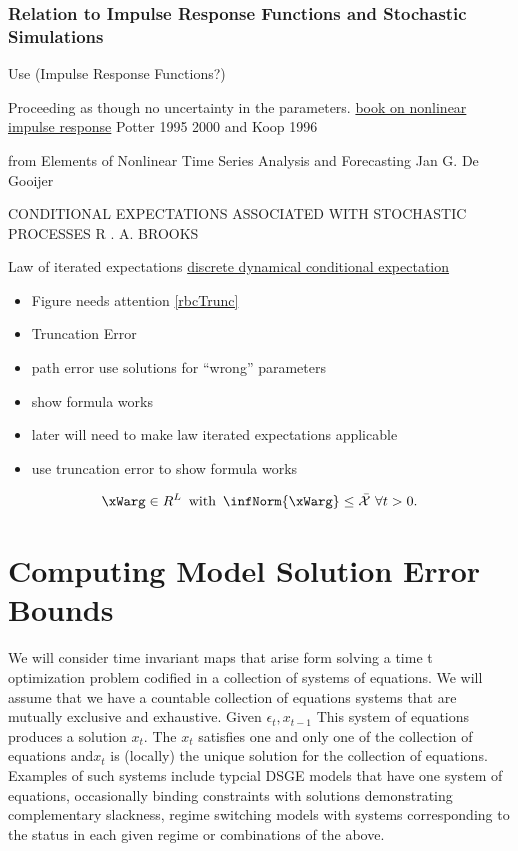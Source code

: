 \documentclass[12pt]{article}
\begin{document}
\subsubsection{Relation to Impulse Response Functions and Stochastic Simulations}
\label{sec:relImp}


Use (Impulse Response Functions?)

Proceeding as though no uncertainty in the parameters.
\href{https://books.google.co.uk/books?id=kLiRDgAAQBAJ&pg=PA77&lpg=PA77&dq=nonlinear+models+impulse+response+function+conditional+expectations&source=bl&ots=1pCjlcgxSu&sig=WA9INrvXVcFhVOd_2wq8-V6alw8&hl=en&sa=X&ved=0ahUKEwid1Y3fvuPWAhUlKsAKHT7lCDkQ6AEITjAF#v=onepage&q=nonlinear%20models%20impulse%20response%20function%20conditional%20expectations&f=false}{book on nonlinear impulse response}
  Potter 1995 2000 and Koop 1996

  from  Elements of Nonlinear Time Series Analysis and Forecasting  Jan G. De Gooijer

CONDITIONAL EXPECTATIONS ASSOCIATED WITH STOCHASTIC PROCESSES
R . A. BROOKS

Law of iterated expectations
\href{http://www.pnas.org/content/103/11/3968.full}{discrete dynamical conditional expectation} 
\label{sec:simple-rbc-model-2}

\begin{itemize}
\item Figure needs attention  \ref{rbcTrunc}
\item Truncation Error
\item path error use solutions for ``wrong'' parameters
\item show formula works
\item later will need to make law iterated expectations applicable
\item use truncation error to show formula works
\end{itemize}


 \begin{gather}
   \xWarg \in{R^L}\,\text{ with }\,\infNorm{\xWarg}  \le \bar{\mathcal{X}}\,\,\forall t> 0 \label{fFamily}.
 \end{gather}

\section{Computing Model Solution Error Bounds}
\label{sec:solnerrorbounds}

We will consider time invariant maps that arise form solving a time t optimization problem codified in a collection of systems of equations.  We will assume that we have a countable collection of equations systems that are mutually exclusive and exhaustive.  Given $\epsilon_t, x_{t-1}$  This system of equations produces a solution $x_t$.  The $x_t$ satisfies one and only one of the collection of equations and$x_t$ is (locally) the unique solution for the collection of
equations.  Examples of such systems include typcial DSGE models that have one
system of equations, occasionally binding constraints with solutions demonstrating complementary slackness, regime switching models with systems corresponding to the status in each given regime or combinations of the above.
\end{document}
